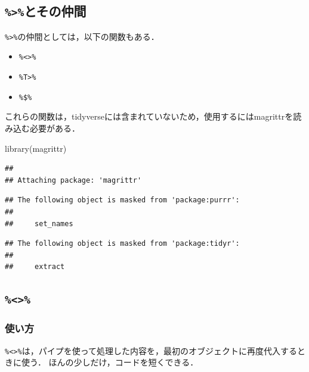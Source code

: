 \documentclass[
]{article}
\newenvironment{Shaded}{\begin{snugshade}}{\end{snugshade}}
\newcommand{\FunctionTok}[1]{\textcolor[rgb]{0.00,0.00,0.00}{#1}}
\newcommand{\NormalTok}[1]{#1}
\providecommand{\tightlist}{%
  \setlength{\itemsep}{0pt}\setlength{\parskip}{0pt}}
\begin{document}
\hypertarget{ux3068ux305dux306eux4ef2ux9593}{%
\subsection{\texorpdfstring{\texttt{\%\textgreater{}\%}とその仲間}{\%\textgreater\%とその仲間}}\label{ux3068ux305dux306eux4ef2ux9593}}

\texttt{\%\textgreater{}\%}の仲間としては，以下の関数もある．

\begin{itemize}
\tightlist
\item
  \texttt{\%\textless{}\textgreater{}\%}
\item
  \texttt{\%T\textgreater{}\%}
\item
  \texttt{\%\$\%}
\end{itemize}

これらの関数は，tidyverseには含まれていないため，使用するにはmagrittrを読み込む必要がある．

\begin{Shaded}
\begin{Highlighting}[]
\FunctionTok{library}\NormalTok{(magrittr)}
\end{Highlighting}
\end{Shaded}

\begin{verbatim}
## 
## Attaching package: 'magrittr'
\end{verbatim}

\begin{verbatim}
## The following object is masked from 'package:purrr':
## 
##     set_names
\end{verbatim}

\begin{verbatim}
## The following object is masked from 'package:tidyr':
## 
##     extract
\end{verbatim}

\hypertarget{section}{%
\subsection{\texorpdfstring{\texttt{\%\textless{}\textgreater{}\%}}{\%\textless\textgreater\%}}\label{section}}

\hypertarget{ux4f7fux3044ux65b9}{%
\subsubsection{使い方}\label{ux4f7fux3044ux65b9}}

\texttt{\%\textless{}\textgreater{}\%}は，パイプを使って処理した内容を，最初のオブジェクトに再度代入するときに使う．
ほんの少しだけ，コードを短くできる．
\end{document}
